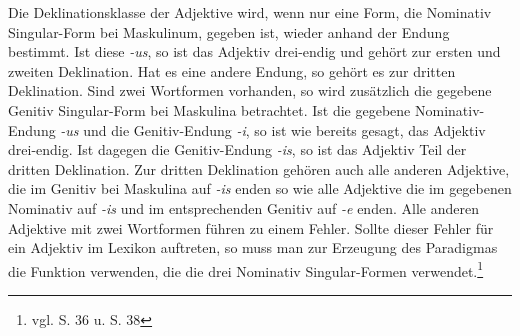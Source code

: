 \documentclass[fontsize=12pt,abstract=on,titlepage,bibliography=totoc,ngerman,listof=totoc]{scrreprt}
\begin{document}
Die Deklinationsklasse der Adjektive wird, wenn nur eine Form, die Nominativ Singular-Form bei Maskulinum, gegeben ist, wieder anhand der Endung bestimmt. Ist diese \textit{-us}, so ist das Adjektiv drei-endig und gehört zur ersten und zweiten Deklination. Hat es eine andere Endung, so gehört es zur dritten Deklination. Sind zwei Wortformen vorhanden, so wird zusätzlich die gegebene Genitiv Singular-Form bei Maskulina betrachtet. Ist die gegebene Nominativ-Endung \textit{-us} und die Genitiv-Endung \textit{-i}, so ist wie bereits gesagt, das Adjektiv drei-endig. Ist dagegen die Genitiv-Endung \textit{-is}, so ist das Adjektiv Teil der dritten Deklination. Zur dritten Deklination gehören auch alle anderen Adjektive, die im Genitiv bei Maskulina auf \textit{-is} enden so wie alle Adjektive die im gegebenen Nominativ auf \textit{-is} und im entsprechenden Genitiv auf \textit{-e} enden. Alle anderen Adjektive mit zwei Wortformen führen zu einem Fehler. Sollte dieser Fehler für ein Adjektiv im Lexikon auftreten, so muss man zur Erzeugung des Paradigmas die Funktion verwenden, die die drei Nominativ Singular-Formen verwendet.\footnote{vgl. \cite{BAYER-LINDAUER1994} S. 36 u. S. 38} \par
\end{document}

